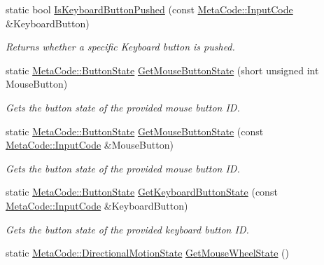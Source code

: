 \begin{DoxyCompactItemize}
\item 
static bool \hyperlink{classphys_1_1InputQueryTool_a3d8efa04d2f98c35d60a4086f930778a}{IsKeyboardButtonPushed} (const \hyperlink{classphys_1_1MetaCode_a3e501cbb5bf0f6f1fdb7211465bda8d8}{MetaCode::InputCode} \&KeyboardButton)
\begin{DoxyCompactList}\small\item\em Returns whether a specific Keyboard button is pushed. \item\end{DoxyCompactList}\item 
static \hyperlink{classphys_1_1MetaCode_a2fdfb26b3e50ceb0ccc60bfc4c3d6ac2}{MetaCode::ButtonState} \hyperlink{classphys_1_1InputQueryTool_a1ef8b70af163d8bc703fd16c3fcce22d}{GetMouseButtonState} (short unsigned int MouseButton)
\begin{DoxyCompactList}\small\item\em Gets the button state of the provided mouse button ID. \item\end{DoxyCompactList}\item 
static \hyperlink{classphys_1_1MetaCode_a2fdfb26b3e50ceb0ccc60bfc4c3d6ac2}{MetaCode::ButtonState} \hyperlink{classphys_1_1InputQueryTool_ada22b6ee93632c85f7b7a0490d418382}{GetMouseButtonState} (const \hyperlink{classphys_1_1MetaCode_a3e501cbb5bf0f6f1fdb7211465bda8d8}{MetaCode::InputCode} \&MouseButton)
\begin{DoxyCompactList}\small\item\em Gets the button state of the provided mouse button ID. \item\end{DoxyCompactList}\item 
static \hyperlink{classphys_1_1MetaCode_a2fdfb26b3e50ceb0ccc60bfc4c3d6ac2}{MetaCode::ButtonState} \hyperlink{classphys_1_1InputQueryTool_a457529e30edf8d3cf5ef04ae6a8db506}{GetKeyboardButtonState} (const \hyperlink{classphys_1_1MetaCode_a3e501cbb5bf0f6f1fdb7211465bda8d8}{MetaCode::InputCode} \&KeyboardButton)
\begin{DoxyCompactList}\small\item\em Gets the button state of the provided keyboard button ID. \item\end{DoxyCompactList}\item 
static \hyperlink{classphys_1_1MetaCode_ad6ed6266b5f4219a6f5da29ebe018757}{MetaCode::DirectionalMotionState} \hyperlink{classphys_1_1InputQueryTool_aa214535768fa838ad9799d3e5ca3cece}{GetMouseWheelState} ()

\end{DoxyCompactItemize}
